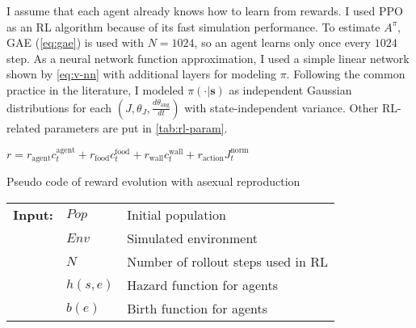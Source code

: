 I assume that each agent already knows how to learn from rewards. I used PPO\citep{schulmanProximalPolicyOptimization2017} as an RL algorithm because of its fast simulation performance. To estimate $A^{\pi}$, GAE (\cref{eq:gae}) is used with $N=1024$, so an agent learns only once every $1024$ step. As a neural network function approximation, I used a simple linear network shown by \cref{eq:v-nn} with additional layers for modeling $\pi$. Following the common practice in the literature, I modeled $\pi(\cdot|\textbf{s})$ as independent Gaussian distributions for each $ (J, \theta_{J}, \frac{d\theta_{\textrm{ang}}}{dt}) $ with state-independent variance. Other RL-related parameters are put in \cref{tab:rl-param}.

$r = r_{\textrm{agent}}c_{t}^{\textrm{agent}} + r_{\textrm{food}}c_{t}^{\textrm{food}} + r_{\textrm{wall}}c_{t}^{\textrm{wall}} + r_{\textrm{action}}J_{t}^{\textrm{norm}}$

\begin{algorithm}
  \caption{Pseudo code of reward evolution with asexual reproduction}\label{alg:reward-evo}
  \begin{tabular}{lll}
    \textbf{Input:} & $Pop$ & Initial population \\
                    & $Env$ & Simulated environment \\
                    & $N$ & Number of rollout steps used in RL \\
                    & $h(s, e)$ & Hazard function for agents \\
                    & $b(e)$ & Birth function for agents \\
  \end{tabular}
  \begin{algorithmic}[1]
    \Loop{}
      \EndOnce{}
    \EndFor{}
      \EndIf{}
    \EndFor{}
  \EndLoop{}
\end{algorithmic}
\end{algorithm}


